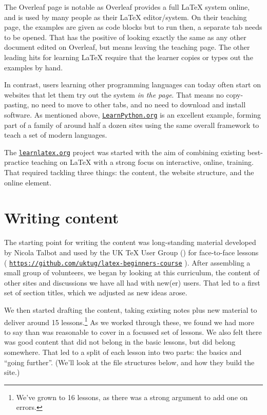 \documentclass[final]{ltugboat}
\begin{document}
The Overleaf page is notable as Overleaf provides a full \LaTeX{} system
online, and is used by many people as their \LaTeX{} editor/system. On their
teaching page, the examples are given as code blocks but to run then, a
separate tab needs to be opened. That has the positive of looking exactly the
same as any other document edited on Overleaf, but means leaving the teaching
page. The other leading hits for learning \LaTeX{} require that the learner
copies or types out the examples by hand.

In contrast, users learning other programming languages can today often start on
websites that let them try out the system \emph{in the page}. That means
no copy-pasting, no need to move to other tabs, and no need to download and
install software. As mentioned above, \href{https://LearnPython.org}{\nolinkurl{LearnPython.org}} is an excellent
example, forming part of a family of around half a dozen sites using the
same overall framework to teach a set of modern languages.

The \href{https://learnlatex.org}{\nolinkurl{learnlatex.org}} project was started with the aim of combining existing
best-practice teaching on \LaTeX{} with a strong focus on interactive, online,
training. That required tackling three things: the content, the website
structure, and the online element.

\section{Writing content}

The starting point for writing the content was long-standing material developed
by Nicola Talbot and used by the UK \TeX{} User Group () for
face-to-face lessons (%
\href{https://github.com/uktug/latex-beginners-course}
     {\texttt{https://github.com/uktug/latex-\break beginners-course}}%
). After 
assembling a small group of volunteers, we began by looking at this curriculum,
the content of other sites and discussions we have all had with new(er) users.
That led to a first set of section titles, which we adjusted as new ideas
arose.

We then started drafting the content, taking existing notes plus new material
to deliver around 15 lessons.\footnote{We've grown to 16 lessons, as there was
a strong argument to add one on errors.} As we worked through these, we found
we had more to say than was reasonable to cover in a focussed set of lessons.
We also felt there was good content that did not belong in the basic lessons,
but did belong somewhere. That led to a split of each lesson into two parts:
the basics and \enquote{going further}. (We'll look at the file structures
below, and how they build the site.)
\end{document}
